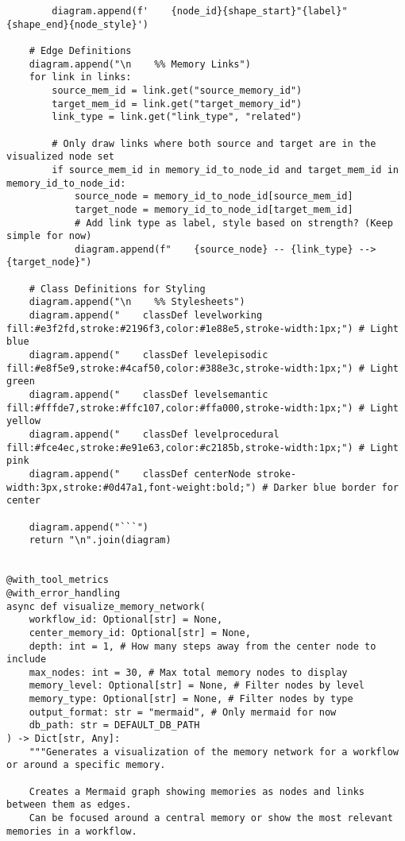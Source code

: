 \documentclass[12pt,a4paper]{article}
\begin{document}
\begin{pageablecode}
\begin{verbatim}
        diagram.append(f'    {node_id}{shape_start}"{label}"{shape_end}{node_style}')

    # Edge Definitions
    diagram.append("\n    %% Memory Links")
    for link in links:
        source_mem_id = link.get("source_memory_id")
        target_mem_id = link.get("target_memory_id")
        link_type = link.get("link_type", "related")

        # Only draw links where both source and target are in the visualized node set
        if source_mem_id in memory_id_to_node_id and target_mem_id in memory_id_to_node_id:
            source_node = memory_id_to_node_id[source_mem_id]
            target_node = memory_id_to_node_id[target_mem_id]
            # Add link type as label, style based on strength? (Keep simple for now)
            diagram.append(f"    {source_node} -- {link_type} --> {target_node}")

    # Class Definitions for Styling
    diagram.append("\n    %% Stylesheets")
    diagram.append("    classDef levelworking fill:#e3f2fd,stroke:#2196f3,color:#1e88e5,stroke-width:1px;") # Light blue
    diagram.append("    classDef levelepisodic fill:#e8f5e9,stroke:#4caf50,color:#388e3c,stroke-width:1px;") # Light green
    diagram.append("    classDef levelsemantic fill:#fffde7,stroke:#ffc107,color:#ffa000,stroke-width:1px;") # Light yellow
    diagram.append("    classDef levelprocedural fill:#fce4ec,stroke:#e91e63,color:#c2185b,stroke-width:1px;") # Light pink
    diagram.append("    classDef centerNode stroke-width:3px,stroke:#0d47a1,font-weight:bold;") # Darker blue border for center

    diagram.append("```")
    return "\n".join(diagram)


@with_tool_metrics
@with_error_handling
async def visualize_memory_network(
    workflow_id: Optional[str] = None,
    center_memory_id: Optional[str] = None,
    depth: int = 1, # How many steps away from the center node to include
    max_nodes: int = 30, # Max total memory nodes to display
    memory_level: Optional[str] = None, # Filter nodes by level
    memory_type: Optional[str] = None, # Filter nodes by type
    output_format: str = "mermaid", # Only mermaid for now
    db_path: str = DEFAULT_DB_PATH
) -> Dict[str, Any]:
    """Generates a visualization of the memory network for a workflow or around a specific memory.

    Creates a Mermaid graph showing memories as nodes and links between them as edges.
    Can be focused around a central memory or show the most relevant memories in a workflow.


\end{verbatim}
\end{pageablecode}
\end{document}

